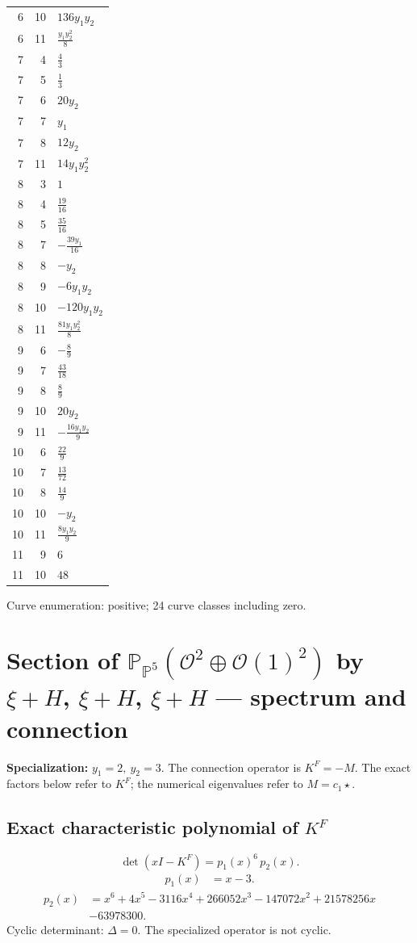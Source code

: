 \documentclass[10pt,a4paper]{article}
\begin{document}
{\begin{longtable}{rrp{125mm}}
6 & 10 & $136 y_{1} y_{2}$\\
6 & 11 & $\frac{y_{1} y_{2}^{2}}{8}$\\
7 & 4 & $\frac{4}{3}$\\
7 & 5 & $\frac{1}{3}$\\
7 & 6 & $20 y_{2}$\\
7 & 7 & $y_{1}$\\
7 & 8 & $12 y_{2}$\\
7 & 11 & $14 y_{1} y_{2}^{2}$\\
8 & 3 & $1$\\
8 & 4 & $\frac{19}{16}$\\
8 & 5 & $\frac{35}{16}$\\
8 & 7 & $- \frac{39 y_{1}}{16}$\\
8 & 8 & $- y_{2}$\\
8 & 9 & $- 6 y_{1} y_{2}$\\
8 & 10 & $- 120 y_{1} y_{2}$\\
8 & 11 & $\frac{81 y_{1} y_{2}^{2}}{8}$\\
9 & 6 & $- \frac{8}{9}$\\
9 & 7 & $\frac{43}{18}$\\
9 & 8 & $\frac{8}{9}$\\
9 & 10 & $20 y_{2}$\\
9 & 11 & $- \frac{16 y_{1} y_{2}}{9}$\\
10 & 6 & $\frac{22}{9}$\\
10 & 7 & $\frac{13}{72}$\\
10 & 8 & $\frac{14}{9}$\\
10 & 10 & $- y_{2}$\\
10 & 11 & $\frac{8 y_{1} y_{2}}{9}$\\
11 & 9 & $6$\\
11 & 10 & $48$\\
\end{longtable}}
Curve enumeration: positive; 24 curve classes including zero.
\clearpage\section*{Section of $\mathbb P_{\mathbb P^{5}}(\mathcal O^{2}\oplus \mathcal O(1)^{2})$ by $\xi +H$, $\xi +H$, $\xi +H$ --- spectrum and connection}
\textbf{Specialization:} $y_1=2,\ y_2=3$. The connection operator is $K^F=-M$. The exact factors below refer to $K^F$; the numerical eigenvalues refer to $M=c_1\star$.
\subsection*{Exact characteristic polynomial of $K^F$}
\[\det(xI-K^F)=p_{1}(x)^{6}\,p_{2}(x).\]
\[\begin{aligned}p_{1}(x)&=x - 3.\end{aligned}\]
\[\begin{aligned}p_{2}(x)&=x^{6} + 4 x^{5} - 3116 x^{4} + 266052 x^{3} - 147072 x^{2} + 21578256 x\\&-63978300.\end{aligned}\]
Cyclic determinant: $\Delta=0$. The specialized operator is not cyclic.
\end{document}
